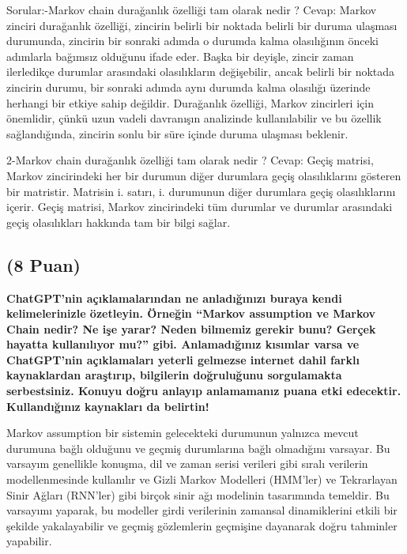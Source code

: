 \documentclass[11pt]{article}
\begin{document}
Sorular:-Markov chain durağanlık özelliği tam olarak nedir ?\newline
Cevap: Markov zinciri durağanlık özelliği, zincirin belirli bir noktada belirli bir duruma ulaşması durumunda, zincirin bir sonraki adımda o durumda kalma olasılığının önceki adımlarla bağımsız olduğunu ifade eder. Başka bir deyişle, zincir zaman ilerledikçe durumlar arasındaki olasılıkların değişebilir, ancak belirli bir noktada zincirin durumu, bir sonraki adımda aynı durumda kalma olasılığı üzerinde herhangi bir etkiye sahip değildir. Durağanlık özelliği, Markov zincirleri için önemlidir, çünkü uzun vadeli davranışın analizinde kullanılabilir ve bu özellik sağlandığında, zincirin sonlu bir süre içinde duruma ulaşması beklenir.

2-Markov chain durağanlık özelliği tam olarak nedir ?\newline
Cevap: Geçiş matrisi, Markov zincirindeki her bir durumun diğer durumlara geçiş olasılıklarını gösteren bir matristir. Matrisin i. satırı, i. durumunun diğer durumlara geçiş olasılıklarını içerir. Geçiş matrisi, Markov zincirindeki tüm durumlar ve durumlar arasındaki geçiş olasılıkları hakkında tam bir bilgi sağlar.

\subsection{(8 Puan)} \textbf{ChatGPT’nin açıklamalarından ne anladığınızı buraya kendi kelimelerinizle özetleyin. Örneğin ``Markov assumption ve Markov Chain nedir? Ne işe yarar? Neden bilmemiz gerekir bunu? Gerçek hayatta kullanılıyor mu?'' gibi. Anlamadığınız kısımlar varsa ve ChatGPT’nin açıklamaları yeterli gelmezse internet dahil farklı kaynaklardan araştırıp, bilgilerin doğruluğunu sorgulamakta serbestsiniz. Konuyu doğru anlayıp anlamamanız puana etki edecektir. Kullandığınız kaynakları da belirtin!}

Markov assumption bir sistemin gelecekteki durumunun yalnızca mevcut durumuna bağlı olduğunu ve geçmiş durumlarına bağlı olmadığını varsayar. Bu varsayım genellikle konuşma, dil ve zaman serisi verileri gibi sıralı verilerin modellenmesinde kullanılır ve Gizli Markov Modelleri (HMM'ler) ve Tekrarlayan Sinir Ağları (RNN'ler) gibi birçok sinir ağı modelinin tasarımında temeldir. Bu varsayımı yaparak, bu modeller girdi verilerinin zamansal dinamiklerini etkili bir şekilde yakalayabilir ve geçmiş gözlemlerin geçmişine dayanarak doğru tahminler yapabilir.
\end{document}
